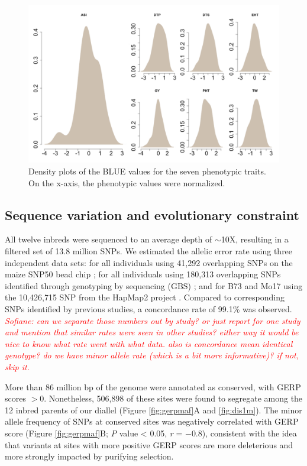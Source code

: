 \documentclass[9pt,twocolumn,twoside]{gsajnl}
\newcommand{\jri}[1]{\textcolor{red}{ \emph{ #1}} }
\begin{document}
\begin{figure}[htbp]
\centering
\includegraphics[width=\linewidth]{Figure_pheno.pdf}
\caption{Density plots of the BLUE values for the seven phenotypic traits. On the x-axis, the phenotypic values were normalized.}
\label{fig:pheno}
\end{figure}



\subsection*{Sequence variation and evolutionary constraint}

All twelve inbreds were sequenced to an average depth of $\sim$10X, resulting in a filtered set of 13.8 million SNPs. 
We estimated the allelic error rate using three independent data sets: for all individuals using 41,292 overlapping SNPs on the maize SNP50 bead chip \citep{Heerwaarden2012}; for all individuals using 180,313 overlapping SNPs identified through genotyping by sequencing (GBS) \citep{Romay2013}; and for B73 and Mo17 using the 10,426,715 SNP from the HapMap2 project \citep{Chia2012}.  Compared to corresponding SNPs identified by previous studies, a concordance rate of 99.1\% was observed. \jri{Sofiane: can we separate those numbers out by study? or just report for one study and mention that similar rates were seen in other studies? either way it would be nice to know what rate went with what data. also is concordance mean identical genotype? do we have minor allele rate (which is a bit more informative)? if not, skip it.} 

More than 86 million bp of the genome were annotated as conserved, with GERP scores $>0$.
Nonetheless, 506,898 of these sites were found to segregate among the 12 inbred parents of our diallel (Figure \ref{fig:gerpmaf}A and \ref{fig:dis1m}).
The minor allele frequency of SNPs at conserved sites was negatively correlated with GERP score (Figure \ref{fig:gerpmaf}B; \emph{P} value < 0.05, \emph{r} = $-0.8$), consistent with the idea that variants at sites with more positive GERP scores are more deleterious and more strongly impacted by purifying selection.
\end{document}
